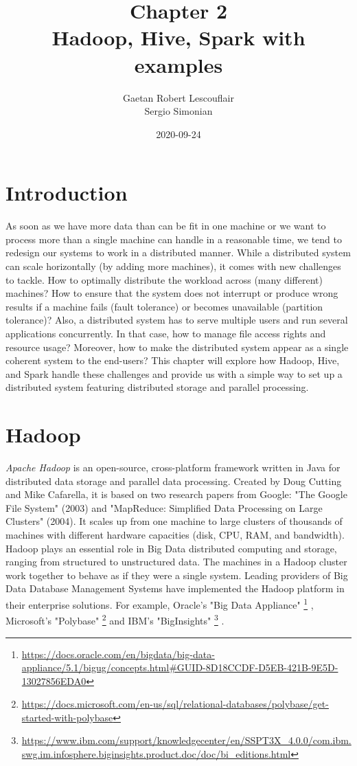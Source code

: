 \documentclass[12pt,english]{book}
\title{Chapter 2\\Hadoop, Hive, Spark with examples}
\date{2020-09-24}
\author{Gaetan Robert Lescouflair\\Sergio Simonian}
\begin{document}
\maketitle
\newpage
{}
\setcounter{chapter}{2}
\setcounter{secnumdepth}{3}	
\setlength\arrayrulewidth{1pt}

\section{Introduction}


As soon as we have more data than can be fit in one machine or we want to process more than a single machine can handle in a reasonable time, we tend to redesign our systems to work in a distributed manner.
While a distributed system can scale horizontally (by adding more machines), it comes with new challenges to tackle.
How to optimally distribute the workload across (many different) machines?
How to ensure that the system does not interrupt or produce wrong results if a machine fails (fault tolerance) or becomes unavailable (partition tolerance)?
Also, a distributed system has to serve multiple users and run several applications concurrently.
In that case, how to manage file access rights and resource usage?
Moreover, how to make the distributed system appear as a single coherent system to the end-users?
This chapter will explore how Hadoop, Hive, and Spark handle these challenges and provide us with a simple way to set up a distributed system featuring distributed storage and parallel processing.
 

\section{Hadoop}


\emph{Apache Hadoop} is an open-source, cross-platform framework written in Java for distributed data storage and parallel data processing.
Created by Doug Cutting and Mike Cafarella, it is based on two research papers from Google: "The Google File System" (2003) and "MapReduce: Simplified Data Processing on Large Clusters" (2004).
It scales up from one machine to large clusters of thousands of machines with different hardware capacities (disk, CPU, RAM, and bandwidth).
Hadoop plays an essential role in Big Data distributed computing and storage, ranging from structured to unstructured data.
The machines in a Hadoop cluster work together to behave as if they were a single system.
Leading providers of Big Data Database Management Systems have implemented the Hadoop platform in their enterprise solutions.
For example, Oracle's "Big Data Appliance"
\footnote{\url{https://docs.oracle.com/en/bigdata/big-data-appliance/5.1/bigug/concepts.html\#GUID-8D18CCDF-D5EB-421B-9E5D-13027856EDA0}}
, Microsoft's "Polybase"
\footnote{\url{https://docs.microsoft.com/en-us/sql/relational-databases/polybase/get-started-with-polybase}}
and IBM's "BigInsights" 
\footnote{\url{https://www.ibm.com/support/knowledgecenter/en/SSPT3X\_4.0.0/com.ibm.swg.im.infosphere.biginsights.product.doc/doc/bi\_editions.html}}
.
\end{document}
